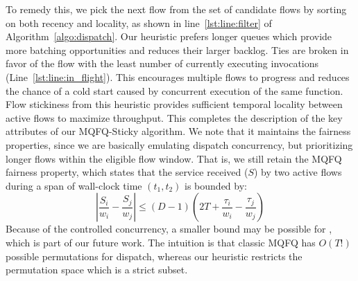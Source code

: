 To remedy this, we pick the next flow from the set of candidate flows by sorting on both recency and locality, as shown in line~\ref{lst:line:filter} of Algorithm~\ref{algo:dispatch}.
Our heuristic prefers longer queues which provide more batching opportunities and reduces their larger backlog.
Ties are broken in favor of the flow with the least number of currently executing invocations (Line~\ref{lst:line:in_flight}).
This encourages multiple flows to progress and reduces the chance of a cold start caused by concurrent execution of the same function.
Flow stickiness from this heuristic provides sufficient temporal locality between active flows to maximize throughput.
This completes the description of the key attributes of our MQFQ-Sticky algorithm.
We note that it maintains the fairness properties, since we are basically emulating dispatch concurrency, but prioritizing longer flows within the eligible flow window.
That is, we still retain the MQFQ fairness property, which states that the service received ($S$) by two active flows during a span of wall-clock time $(t_1, t_2)$ is bounded by:
\vspace{-0.1cm}
\begin{equation}
  \label{eq:fairness}
 \left|\dfrac{S_i}{w_i} - \dfrac{S_j}{w_j} \right| \leq (D-1) \left(2T + \dfrac{\tau_i}{w_i} -\dfrac{\tau_j}{w_j} \right)
\end{equation}
\vspace{-0.1cm}
Because of the controlled concurrency, a smaller bound may be possible for \QName, which is part of our future work. 
The intuition is that classic MQFQ has $O(T!)$ possible permutations for dispatch, whereas our heuristic restricts the permutation space which is a strict subset. 


